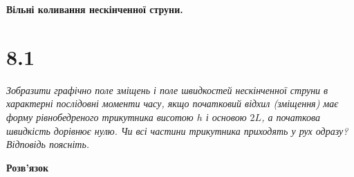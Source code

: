 


%


\textbf{\large Вільні коливання нескінченної струни.}

\section[Задача №8.1]{8.1}

\textit{Зобразити графічно поле зміщень і поле швидкостей нескінченної струни в характерні послідовні моменти часу, якщо початковий відхил (зміщення) має форму рівнобедреного трикутника висотою $h$ і основою $2L$, а початкова швидкість дорівнює нулю. Чи всі частини трикутника приходять у рух одразу? Відповідь поясніть.}

\begin{center}
    \large{\textbf{Розв'язок}}
\end{center}

